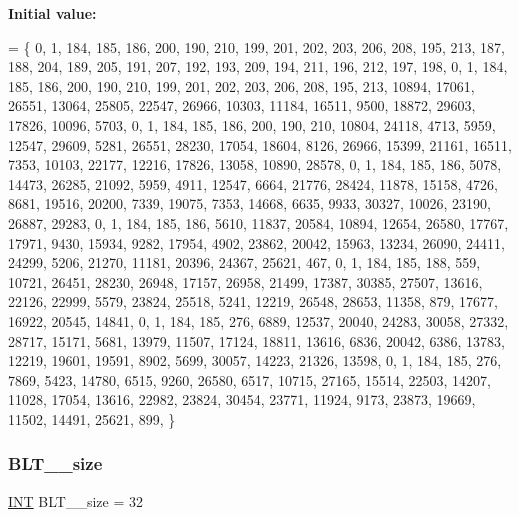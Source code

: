 {\bfseries Initial value\+:}
\begin{DoxyCode}
= \{
    0, 1, 184, 185, 186, 200, 190, 210, 199, 201, 202, 203, 206, 208, 195, 213, 187, 188, 204, 189, 205, 
      191, 207, 192, 193, 209, 194, 211, 196, 212, 197, 198, 
    0, 1, 184, 185, 186, 200, 190, 210, 199, 201, 202, 203, 206, 208, 195, 213, 10894, 17061, 26551, 13064,
       25805, 22547, 26966, 10303, 11184, 16511, 9500, 18872, 29603, 17826, 10096, 5703, 
    0, 1, 184, 185, 186, 200, 190, 210, 10804, 24118, 4713, 5959, 12547, 29609, 5281, 26551, 28230, 17054, 
      18604, 8126, 26966, 15399, 21161, 16511, 7353, 10103, 22177, 12216, 17826, 13058, 10890, 28578, 
    0, 1, 184, 185, 186, 5078, 14473, 26285, 21092, 5959, 4911, 12547, 6664, 21776, 28424, 11878, 15158, 
      4726, 8681, 19516, 20200, 7339, 19075, 7353, 14668, 6635, 9933, 30327, 10026, 23190, 26887, 29283, 
    0, 1, 184, 185, 186, 5610, 11837, 20584, 10894, 12654, 26580, 17767, 17971, 9430, 15934, 9282, 17954, 
      4902, 23862, 20042, 15963, 13234, 26090, 24411, 24299, 5206, 21270, 11181, 20396, 24367, 25621, 467, 
    0, 1, 184, 185, 188, 559, 10721, 26451, 28230, 26948, 17157, 26958, 21499, 17387, 30385, 27507, 13616, 
      22126, 22999, 5579, 23824, 25518, 5241, 12219, 26548, 28653, 11358, 879, 17677, 16922, 20545, 14841, 
    0, 1, 184, 185, 276, 6889, 12537, 20040, 24283, 30058, 27332, 28717, 15171, 5681, 13979, 11507, 17124, 
      18811, 13616, 6836, 20042, 6386, 13783, 12219, 19601, 19591, 8902, 5699, 30057, 14223, 21326, 13598, 
    0, 1, 184, 185, 276, 7869, 5423, 14780, 6515, 9260, 26580, 6517, 10715, 27165, 15514, 22503, 14207, 
      11028, 17054, 13616, 22982, 23824, 30454, 23771, 11924, 9173, 23873, 19669, 11502, 14491, 25621, 899, 
\}
\end{DoxyCode}
\mbox{\label{data___b_l_t_8_c_adb99d6cf8f61fb2fca00870e678fc7dc}} 
\subsubsection{\texorpdfstring{B\+L\+T\+\_\+\_\+size}{BLT\_31\_size}}
{\footnotesize\ttfamily \mbox{\hyperlink{galois_8h_a09fddde158a3a20bd2dcadb609de11dc}{I\+NT}} B\+L\+T\+\_\+\_\+size = 32}

\mbox{\label{data___b_l_t_8_c_ab59c688ca406a9f7e87108d44b5527fd}} 
